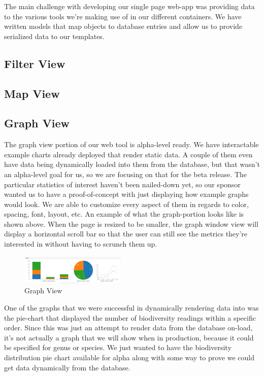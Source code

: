 \documentclass[journal]{IEEEtran}
\begin{document}
The main challenge with developing our single page web-app was providing data to the various tools we’re making use of in our different containers.
We have written models that map objects to database entries and allow us to provide serialized data to our templates.

\subsection{Filter View}

\subsection{Map View}

\subsection{Graph View} %
The graph view portion of our web tool is alpha-level ready.
We have interactable example charts already deployed that render  static data.
A couple of them even have data being dynamically loaded into them from the database, but that wasn’t an alpha-level goal for us, so we are focusing on that for the beta release.
The particular statistics of interest haven’t been nailed-down yet, so our sponsor wanted us to have a proof-of-concept with just displaying how example graphs would look.
We are able to customize every aspect of them in regards to color, spacing, font, layout, etc.
An example of what the graph-portion looks like is shown above.
When the page is resized to be smaller, the graph window view will display a horizontal scroll bar so that the user can still see the metrics they’re interested in without having to scrunch them up.

\begin{figure}[h]
\caption{Graph View}
\centering
\includegraphics[width=0.45\textwidth]{images/figure_6.jpg}
\end{figure}

One of the graphs that we were successful in dynamically rendering data into was the pie-chart that displayed the number of biodiversity readings within a specific order.
Since this was just an attempt to render data from the database on-load, it’s not actually a graph that we will show when in production, because it could be specified for genus or species.
We just wanted to have the biodiversity distribution pie chart available for alpha along with some way to prove we could get data dynamically from the database.
\end{document}
